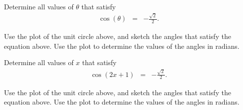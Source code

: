 \begin{problem}
\item Determine all values of $\theta$ that satisfy
  \begin{eqnarray*}
    \cos(\theta) & = & -\frac{\sqrt{2}}{2}.
  \end{eqnarray*}


  Use the plot of the unit circle above, and sketch the angles that
  satisfy the equation above. Use the plot to determine the values of
  the angles in radians.

  \vfill

  \clearpage

\item Determine all values of $x$ that satisfy
  \begin{eqnarray*}
    \cos(2x+1) & = & -\frac{\sqrt{2}}{2}.
  \end{eqnarray*}




  Use the plot of the unit circle above, and sketch the angles that
  satisfy the equation above. Use the plot to determine the values of
  the angles in radians.


\end{problem}
